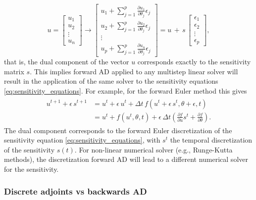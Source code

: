 \begin{equation}
    u =
    \begin{bmatrix}
    u_1 \\
    u_2 \\
    \vdots \\
    u_n
    \end{bmatrix}
    \rightarrow
    \begin{bmatrix}
    u_1 + \sum_{j=1}^p \frac{\partial u_1}{\partial \theta_j} \epsilon_j \\
    u_2 + \sum_{j=1}^p \frac{\partial u_2}{\partial \theta_j} \epsilon_j \\
    \vdots \\
    u_p + \sum_{j=1}^p \frac{\partial u_n}{\partial \theta_j} \epsilon_j
    \end{bmatrix}
    = 
    u \, + \, s \, 
    \begin{bmatrix}
    \epsilon_1 \\
    \epsilon_2 \\
    \vdots \\
    \epsilon_p
    \end{bmatrix},
\end{equation}
that is, the dual component of the vector $u$ corresponds exactly to the sensitivity matrix $s$. 
This implies forward AD applied to any multistep linear solver will result in the application of the same solver to the sensitivity equations \eqref{eq:sensitivity_equations}.  
For example, for the forward Euler method this gives 
\begin{align}
\begin{split}
    u^{t+1} + \epsilon \, s^{t+1}
    &= 
    u^t + \epsilon \, u^t + \Delta t \, f (u^t + \epsilon \, s^t, \theta + \epsilon, t) \\
    &= 
    u^t + f(u^t, \theta, t) 
    + 
    \epsilon \, \Delta t 
    \left( 
    \frac{\partial f}{\partial u} s^t + 
    \frac{\partial f}{\partial \theta}
    \right).
\end{split}
\label{eq:sensitivity-equation-AD}
\end{align}
The dual component corresponds to the forward Euler discretization of the sensitivity equation \eqref{eq:sensitivity_equations}, with $s^t$ the temporal discretization of the sensitivity $s(t)$.
For non-linear numerical solver (e.g., Runge-Kutta methods), the discretization forward AD will lead to a different numerical solver for the sensitivity.  

\subsubsection{Discrete adjoints vs backwards AD}
\label{section:comparison-discrete-adjoint-AD}


